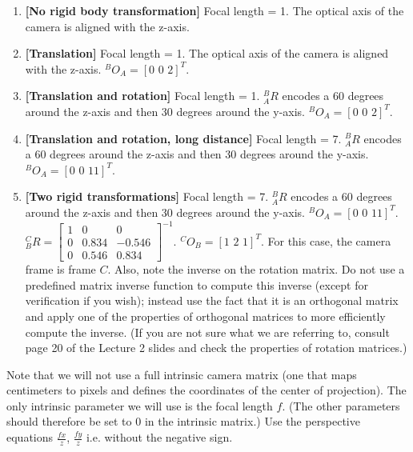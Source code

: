 \documentclass[11pt]{article}
\providecommand{\tightlist}{%
      \setlength{\itemsep}{0pt}\setlength{\parskip}{0pt}}
\begin{document}
\begin{enumerate}
\def\labelenumi{\arabic{enumi}.}
\tightlist
\item
  \textbf{{[}No rigid body transformation{]}} Focal length = 1. The
  optical axis of the camera is aligned with the z-axis.
\item
  \textbf{{[}Translation{]}} Focal length = 1. The optical axis of the
  camera is aligned with the z-axis. \(^BO_A = [\text{0 0 2}]^T\).
\item
  \textbf{{[}Translation and rotation{]}} Focal length = 1. \(^B_AR\)
  encodes a 60 degrees around the z-axis and then 30 degrees around the
  y-axis. \(^BO_A = [\text{0 0 2}]^T\).
\item
  \textbf{{[}Translation and rotation, long distance{]}} Focal length =
  7. \(^B_AR\) encodes a 60 degrees around the z-axis and then 30
  degrees around the y-axis. \(^BO_A = [\text{0 0 11}]^T\).
\item
  \textbf{{[}Two rigid transformations{]}} Focal length = 7. \(^B_AR\)
  encodes a 60 degrees around the z-axis and then 30 degrees around the
  y-axis. \(^BO_A = [\text{0 0 11}]^T\).
  \(^C_BR = \begin{bmatrix}1 & 0 & 0 \\ 0 & 0.834 & -0.546 \\ 0 & 0.546 & 0.834\end{bmatrix}^{-1}\).
  \(^CO_B = [\text{1 2 1}]^T\). For this case, the camera frame is frame
  \(C\). Also, note the inverse on the rotation matrix. Do not use a
  predefined matrix inverse function to compute this inverse (except for
  verification if you wish); instead use the fact that it is an
  orthogonal matrix and apply one of the properties of orthogonal
  matrices to more efficiently compute the inverse. (If you are not sure
  what we are referring to, consult page 20 of the Lecture 2 slides and
  check the properties of rotation matrices.)
\end{enumerate}

Note that we will not use a full intrinsic camera matrix (one that maps
centimeters to pixels and defines the coordinates of the center of
projection). The only intrinsic parameter we will use is the focal
length \(f\). (The other parameters should therefore be set to 0 in the
intrinsic matrix.) Use the perspective equations \(\frac{fx}{z}\),
\(\frac{fy}{z}\) i.e. without the negative sign.
\end{document}
